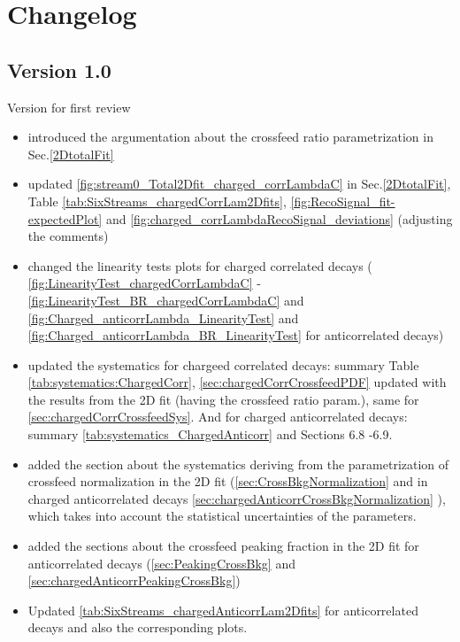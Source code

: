  
\section*{Changelog}

\subsection*{Version 1.0}
Version for first review

\begin{itemize}
	\item introduced the argumentation about the crossfeed ratio parametrization in Sec.\ref{2DtotalFit}
	\item updated \cref{fig:stream0_Total2Dfit_charged_corrLambdaC} in Sec.\ref{2DtotalFit}, Table \ref{tab:SixStreams_chargedCorrLam2Dfits}, \cref{fig:RecoSignal_fit-expectedPlot} and \cref{fig:charged_corrLambdaRecoSignal_deviations} (adjusting the comments)
	\item changed the linearity tests plots for charged correlated decays ( \cref{fig:LinearityTest_chargedCorrLambdaC} - \cref{fig:LinearityTest_BR_chargedCorrLambdaC} and \cref{fig:Charged_anticorrLambda_LinearityTest} and \cref{fig:Charged_anticorrLambda_BR_LinearityTest} for anticorrelated decays)
	\item updated the systematics for chargeed correlated decays: summary Table \ref{tab:systematics:ChargedCorr},   \cref{sec:chargedCorrCrossfeedPDF}  updated with the results from the 2D fit (having the crossfeed ratio param.), 
same for \cref{sec:chargedCorrCrossfeedSys}. And for charged anticorrelated decays: summary \cref{tab:systematics_ChargedAnticorr} and Sections 6.8 -6.9.
	\item added the section about the systematics deriving from the parametrization of crossfeed normalization in  the 2D fit (\cref{sec:CrossBkgNormalization} and in charged anticorrelated decays \cref{sec:chargedAnticorrCrossBkgNormalization} ), which takes into account the statistical uncertainties of the parameters.
	\item added the sections about the crossfeed peaking fraction in the 2D fit for anticorrelated decays (\cref{sec:PeakingCrossBkg} and \cref{sec:chargedAnticorrPeakingCrossBkg}) 
	\item  Updated \cref{tab:SixStreams_chargedAnticorrLam2Dfits} for anticorrelated decays and also the corresponding plots.

\end{itemize}
